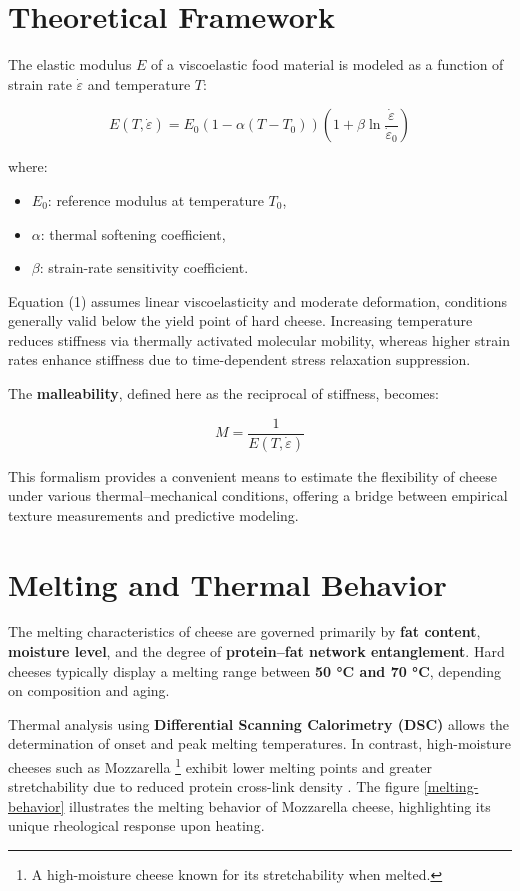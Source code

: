 \documentclass[a4paper,twoside]{article}
\begin{document}
\section{Theoretical Framework}\label{theoretical-framework}

The elastic modulus $E$ of a viscoelastic food material is modeled as a function
of strain rate $\dot{\varepsilon}$ and temperature $T$:

$$
E(T, \dot{\varepsilon}) = E_0 \left( 1 - \alpha (T - T_0) \right)
\left( 1 + \beta \ln \frac{\dot{\varepsilon}}{\dot{\varepsilon}_0} \right)
$$

where:

\begin{itemize}
\item{} $E_0$: reference modulus at temperature $T_0$,
\item{} $\alpha$: thermal softening coefficient,
\item{} $\beta$: strain-rate sensitivity coefficient.

\end{itemize}
Equation (1) assumes linear viscoelasticity and moderate deformation, conditions
generally valid below the yield point of hard cheese. Increasing temperature
reduces stiffness via thermally activated molecular mobility, whereas higher
strain rates enhance stiffness due to time-dependent stress relaxation suppression.

The \textbf{malleability}, defined here as the reciprocal of stiffness, becomes:

$$
M = \frac{1}{E(T, \dot{\varepsilon})}
$$

This formalism provides a convenient means to estimate the flexibility of cheese
under various thermal--mechanical conditions, offering a bridge between empirical
texture measurements and predictive modeling.

\section{Melting and Thermal Behavior}\label{melting-and-thermal-behavior}

The melting characteristics of cheese are governed primarily by \textbf{fat content},
\textbf{moisture level}, and the degree of \textbf{protein--fat network entanglement}. Hard
cheeses typically display a melting range between \textbf{50 °C and 70 °C}, depending
on composition and aging.

Thermal analysis using \textbf{Differential Scanning Calorimetry (DSC)} allows the
determination of onset and peak melting temperatures. In contrast, high-moisture
cheeses such as Mozzarella \footnote{A high-moisture cheese known for its stretchability when melted.} exhibit lower melting points and greater
stretchability due to reduced protein cross-link density \cite{WADHWANI20111713}.
The figure  \ref{melting-behavior} illustrates the melting behavior of Mozzarella
cheese, highlighting its unique rheological response upon heating.
\end{document}
